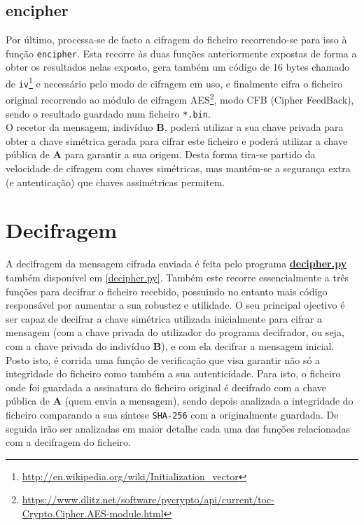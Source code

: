 \documentclass[a4paper,11pt,openright,oneside]{report}
\begin{document}
\subsection{encipher}

Por último, processa-se de facto a cifragem do ficheiro recorrendo-se para isso à função \verb|encipher|. Esta recorre às duas funções anteriormente expostas de forma a obter os resultados nelas exposto, gera também um código de 16 bytes chamado de \verb|iv|\footnote{\url{http://en.wikipedia.org/wiki/Initialization_vector}} e necessário pelo modo de cifragem em uso, e finalmente cifra o ficheiro original recorrendo ao módulo de cifragem AES\footnote{\url{https://www.dlitz.net/software/pycrypto/api/current/toc-Crypto.Cipher.AES-module.html}}, modo CFB (Cipher FeedBack), sendo o resultado guardado num ficheiro \verb|*.bin|.\\

O recetor da mensagem, indivíduo \textbf{B}, poderá utilizar a sua chave privada para obter a chave simétrica gerada para cifrar este ficheiro e poderá utilizar a chave pública de \textbf{A} para garantir a sua origem. Desta forma tira-se partido da velocidade de cifragem com chaves simétricas, mas mantém-se a segurança extra (e autenticação) que chaves assimétricas permitem.

\section{Decifragem}

A decifragem da mensagem cifrada enviada é feita pelo programa \href{../Python/Receiver/decipher.py}{\textbf{de\-ci\-pher.py}} também disponível em \ref{decipher.py}. Também este recorre essencialmente a três funções para decifrar o ficheiro recebido, possuindo no entanto mais código responsável por aumentar a sua robustez e utilidade. O seu principal ojectivo é ser capaz de decifrar a chave simétrica utilizada inicialmente para cifrar a mensagem (com a chave privada do utilizador do programa decifrador, ou seja, com a chave privada do indivíduo \textbf{B}), e com ela decifrar a mensagem inicial. Posto isto, é corrida uma função de verificação que visa garantir não só a integridade do ficheiro como também a sua autenticidade. Para isto, o ficheiro onde foi guardada a assinatura do ficheiro original é decifrado com a chave pública de \textbf{A} (quem envia a mensagem), sendo depois analizada a integridade do ficheiro comparando a sua síntese \verb|SHA-256| com a originalmente guardada. De seguida irão ser analizadas em maior detalhe cada uma das funções relacionadas com a decifragem do ficheiro.
\end{document}
